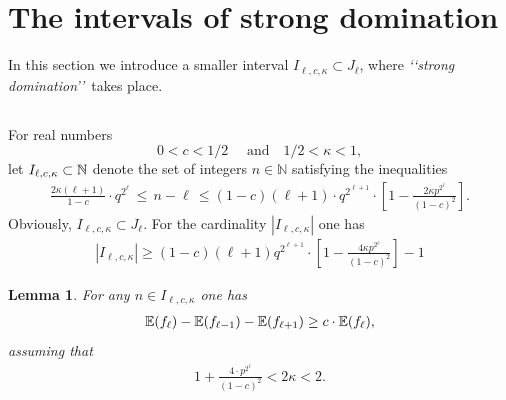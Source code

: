\documentclass[11pt,twoside, reqno]{amsart}
\theoremstyle{plain}
\newtheorem{lema}{Lemma}
\theoremstyle{definition}
\newcommand{\N}{\mathbb{N}}
\begin{document}
\section{The intervals of strong domination}


In this section we introduce  a smaller interval 
$I_{\ell, c, \kappa}\subset J_\ell$, where {\it \lq\lq strong domination\rq\rq}\   takes place.
\subsection{} For real numbers 
$$0<c<1/2\quad\mbox{ and}\quad  1/2 <\kappa<1,$$ let $I_{\ell,c, \kappa}\subset \Bbb N$ denote 
the set of integers $n\in \N$ satisfying the inequalities
\begin{eqnarray}\label{in:26a}
 \frac{2\kappa(\ell+1)}{1-c} \cdot q^{2^{\ell}}\, \le \, n-\ell \, \le
 (1-c)(\ell+1) \cdot q^{2^{\ell+1}}\cdot\left[1-\frac{2\kappa p^{2^{\ell}}}{(1-c)^2}\right].
 \end{eqnarray}
 Obviously, $I_{\ell, c, \kappa}\subset J_\ell$. For the cardinality $|I_{\ell, c, \kappa}|$ one has
 \begin{eqnarray}\label{eq:ilc}
|I_{\ell, c, \kappa}| \ge  (1-c)(\ell+1)q^{2^{\ell+1}}\cdot \left[1-\frac{4\kappa p^{2{^\ell}}}{(1-c)^2}\right]-1 %
 \end{eqnarray} 
\begin{lema} For any $n\in I_{\ell, c, \kappa}$ %
one has
\begin{eqnarray}\label{ineq:19a}
\Bbb E(f_{\ell})-\Bbb E(f_{\ell-1}) - \Bbb E(f_{\ell+1})\ge c \cdot\Bbb E(f_{\ell}),
\end{eqnarray}
assuming that \begin{eqnarray}\label{in:new1}
1+\frac{4\cdot p{^{2^\ell}}}{(1-c)^2}<2\kappa<2.
\end{eqnarray} %
\end{lema}
\end{document}
